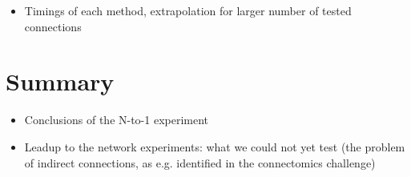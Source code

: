 \begin{itemize}
    \item Timings of each method, extrapolation for larger number of tested connections
\end{itemize}

\section{Summary}

\begin{itemize}
    \item Conclusions of the N-to-1 experiment
    \item Leadup to the network experiments: what we could not yet test (the problem of indirect connections, as e.g. identified in the connectomics challenge)
\end{itemize}
